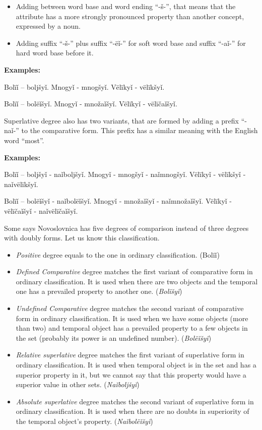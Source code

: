 \begin{itemize}
	\item Adding between word base and word ending “-š-”, that means that the attribute has a more strongly pronounced property than another concept, expressed by a noun.
	\item Adding suffix “-š-” plus suffix “-ëǐ-” for soft word base and suffix “-aǐ-” for hard word base before it.
\end{itemize}

\textbf{Examples:}

Bolïǐ – boljšyǐ. Mnogyǐ - mnogšyǐ. Vëlïkyǐ - vëlïkšyǐ.

Bolïǐ – bolëǐšyǐ. Mnogyǐ - množaǐšyǐ. Vëlïkyǐ - vëlïčaǐšyǐ.

Superlative degree also has two variants, that are formed by adding a prefix “-naǐ-” to the comparative form. This prefix has a similar meaning with the English word “most”.

\textbf{Examples:}

Bolïǐ – boljšyǐ - naǐboljšyǐ. Mnogyǐ - mnogšyǐ - naǐmnogšyǐ. Vëlïkyǐ - vëlïkšyǐ - naǐvëlïkšyǐ.

Bolïǐ – bolëǐšyǐ - naǐbolëǐšyǐ. Mnogyǐ - množaǐšyǐ - naǐmnožaǐšyǐ. Vëlïkyǐ - vëlïčaǐšyǐ - naǐvëlïčaǐšyǐ.

Some says Novoslovnica has five degrees of comparison instead of three degrees with doubly forms. Let us know this classification.

\begin{itemize}
	\item \textit{Positive} degree equals to the one in ordinary classification. (Bolïǐ)

	\item \textit{Defined Comparative} degree matches the first variant of comparative form in ordinary classification. It is used when there are two objects and the temporal one has a prevailed property to another one. (\textit{Bolïšyǐ})

	\item \textit{Undefined Comparative} degree matches the second variant of comparative form in ordinary classification. It is used when we have some objects (more than two) and temporal object has a prevailed property to a few objects in the set (probably its power is an undefined number). (\textit{Bolëǐšyǐ})

	\item \textit{Relative superlative} degree matches the first variant of superlative form in ordinary classification. It is used when temporal object is in the set and has a superior property in it, but we cannot say that this property would have a superior value in other sets. (\textit{Naǐboljšyǐ})

	\item \textit{Absolute superlative} degree matches the second variant of superlative form in ordinary classification. It is used when there are no doubts in superiority of the temporal object’s property. (\textit{Naǐbolëǐšyǐ})
\end{itemize}


